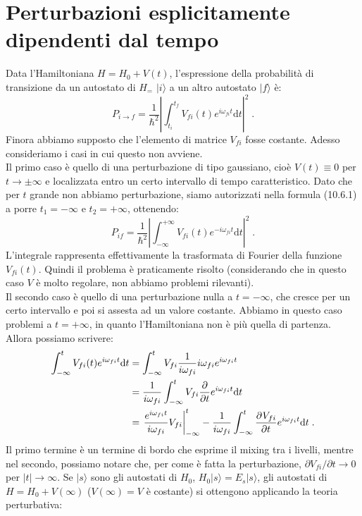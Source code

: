 \documentclass[12pt,a4paper]{report}
\theoremstyle{definition}
\newcommand{\pdev}[3][]{\frac{\partial^{#1} #2}{\partial #3^{#1}}}
\numberwithin{equation}{section}
\newcommand{\diff}[1][]{\mathrm{d}#1}
\newcommand{\ket}{\rangle}
\begin{document}
\section{Perturbazioni esplicitamente dipendenti dal tempo}
Data l'Hamiltoniana $H=H_0+V(t)$, l'espressione della probabilità di transizione da un autostato di $H_=$ $|i\ket$ a un altro autostato $|f\ket$ è:
\begin{equation}
P_{i\to f}=\frac{1}{\hbar^2}\left|\int_{t_i}^{t_f} V_{fi}(t)e^{i\omega_{fi}t}\diff{t}\right|^2\;.
\end{equation}
Finora abbiamo supposto che l'elemento di matrice $V_{fi}$ fosse costante. Adesso consideriamo i casi in cui questo non avviene. \\
Il primo caso è quello di una perturbazione di tipo gaussiano, cioè $V(t)\equiv 0$ per $t\to\pm\infty$ e localizzata entro un certo intervallo di tempo caratteristico. Dato che per $t$ grande non abbiamo perturbazione, siamo autorizzati nella formula (10.6.1) a porre $t_1=-\infty$ e $t_2=+\infty$, ottenendo:
\begin{equation}
P_{if}=\frac{1}{\hbar^2}\left|\int_{-\infty}^{+\infty} V_{fi}(t)e^{-i\omega_{fi}t}\diff{t}\right|^2\;.
\end{equation}
L'integrale rappresenta effettivamente la trasformata di Fourier della funzione $V_{fi}(t)$. Quindi il problema è praticamente risolto (considerando che in questo caso $V$ è molto regolare, non abbiamo problemi rilevanti).\\
Il secondo caso è quello di una perturbazione nulla a $t=-\infty$, che cresce per un certo intervallo e poi si assesta ad un valore costante. Abbiamo in questo caso problemi a $t=+\infty$, in quanto l'Hamiltoniana non è più quella di partenza. Allora possiamo scrivere:
\begin{align}
\int_{-\infty}^t V_{fi}(t)e^{i\omega_{fi}t}\diff{t}&= \int_{-\infty}^t V_{fi}\frac{1}{i\omega_{fi}}i\omega_{fi}e^{i\omega_{fi}t} \notag \\
&= \frac{1}{i\omega_{fi}}\int_{-\infty}^t V_{fi}\frac{\partial}{\partial t}e^{i\omega_{fi}t}\diff{t} \notag \\
&= \left.\frac{e^{i\omega_{fi}t}}{i\omega_{fi}}V_{fi}\right|^t_{-\infty}-\frac{1}{i\omega_{fi}}\int_{-\infty}^t\pdev{V_{fi}}{t}e^{i\omega_{fi}t}\diff{t}\;.
\end{align}
Il primo termine è un termine di bordo che esprime il mixing tra i livelli, mentre nel secondo, possiamo notare che, per come è fatta la perturbazione, $\partial V_{fi}/\partial t\to 0$ per $|t|\to\infty$. Se $|s\ket$ sono gli autostati di $H_0$, $H_0|s\ket=E_s|s\ket$, gli autostati di $H=H_0+V(\infty)$ ($V(\infty)=V$ è costante) si ottengono applicando la teoria perturbativa:
\end{document}
